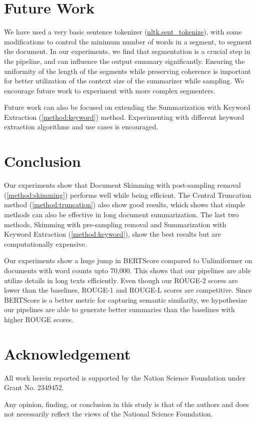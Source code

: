 \section{Future Work}
\label{sec:future-work}

We have used a very basic sentence tokenizer
(\href{https://www.nltk.org/api/nltk.tokenize.sent_tokenize.html}{nltk.sent\_tokenize}),
with some modifications to control the minimum number of words in a segment,
to segment the document.
In our experiments, we find that segmentation is a crucial step in the pipeline, and can
influence the output summary significantly.
Ensuring the uniformity of the length of the segments while preserving coherence is
important for better utilization of the context size of the summarizer while sampling.
We encourage future work to experiment with more complex segmenters.

Future work can also be focused on extending the Summarization with Keyword Extraction
(\ref{method:keyword}) method.
Experimenting with different keyword extraction algorithms and use cases is encouraged.


\section{Conclusion}
\label{sec:conclusion}

Our experiments show that Document Skimming with post-sampling removal
(\ref{method:skimming}) performs well while being efficient.
The Central Truncation method (\ref{method:truncation}) also show good results,
which shows that simple methods can also be effective in long document summarization.
The last two methods, Skimming with pre-sampling removal and Summarization with Keyword
Extraction (\ref{method:keyword}), show the best results but are computationally expensive.

Our experiments show a huge jump in BERTScore compared to Unlimiformer on documents
with word counts upto 70,000.
This shows that our pipelines are able utilize details in long texts efficiently.
Even though our ROUGE-2 scores are lower than the baselines, ROUGE-1 and ROUGE-L
scores are competitive.
Since BERTScore is a better metric for capturing semantic similarity, we hypothesize
our pipelines are able to generate better summaries than the baselines with higher
ROUGE scores.


\section*{Acknowledgement}

All work herein reported is supported by the Nation Science Foundation under Grant
No. 2349452.

Any opinion, finding, or conclusion in this study is that of the authors and does not
necessarily reflect the views of the National Science Foundation.
